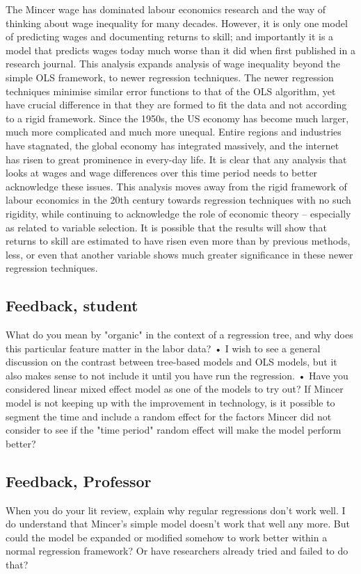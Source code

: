 \documentclass[notitlepage,12pt]{article}
\begin{document}
The Mincer wage has dominated labour economics research and the way of thinking about wage inequality for many decades.  However, it is only one model of predicting wages and documenting returns to skill; and importantly it is a model that predicts wages today much worse than it did when first published in a research journal.  This analysis expands analysis of wage inequality beyond the simple OLS framework, to newer regression techniques.  The newer regression techniques minimise similar error functions to that of the OLS algorithm, yet have crucial difference in that they are formed to fit the data and not according to a rigid framework.  Since the 1950s, the US economy has become much larger, much more complicated and much more unequal.  Entire regions and industries have stagnated, the global economy has integrated massively, and the internet has risen to great prominence in every-day life.  It is clear that any analysis that looks at wages and wage differences over this time period needs to better acknowledge these issues.  This analysis moves away from the rigid framework of labour economics in the 20th century towards regression techniques with no such rigidity, while continuing to acknowledge the role of economic theory -- especially as related to variable selection.  It is possible that the results will show that returns to skill are estimated to have risen even more than by previous methods, less, or even that another variable shows much greater significance in these newer regression techniques.

\subsection{Feedback, student}
What do you mean by "organic" in the context of a regression tree, and why does this particular feature matter in the labor data?
• I wish to see a general discussion on the contrast between tree-based models and OLS models, but it also makes sense to not include it until you have run the regression. 
• Have you considered linear mixed effect model as one of the models to try out? If Mincer model is not keeping up with the improvement in technology, is it possible to segment the time and include a random effect for the factors Mincer did not consider to see if the "time period" random effect will make the model perform better?

\subsection{Feedback, Professor}
When you do your lit review, explain why regular regressions don't work well.  I do understand that Mincer's simple model doesn't work that well any more.  But could the model be expanded or modified somehow to work better within a normal regression framework?  Or have researchers already tried and failed to do that?  
\end{document}
